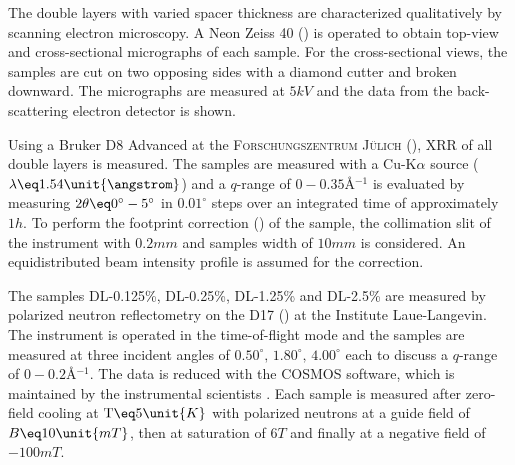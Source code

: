 \documentclass[\main/dresen_thesis.tex]{subfiles}
\begin{document}
    The double layers with varied spacer thickness are characterized qualitatively by scanning electron microscopy.
    A Neon Zeiss 40 () is operated to obtain top-view and cross-sectional micrographs of each sample.
    For the cross-sectional views, the samples are cut on two opposing sides with a diamond cutter and broken downward.
    The micrographs are measured at $5 \unit{kV}$ and the data from the back-scattering electron detector is shown.

    Using a Bruker D8 Advanced at the \textsc{Forschungszentrum J\"ulich} (), XRR of all double layers is measured.
    The samples are measured with a Cu-K$\alpha$ source ($\lambda \eq 1.54 \unit{\angstrom}$) and a $q$-range of $0 - 0.35 \unit{\angstrom^{-1}}$ is evaluated by measuring $2 \theta \eq 0^\circ - 5 ^\circ$ in $0.01 ^\circ$ steps over an integrated time of approximately $1 \unit{h}$.
    To perform the footprint correction () of the sample, the collimation slit of the instrument with $0.2 \unit{mm}$ and samples width of $10 \unit{mm}$ is considered.
    An equidistributed beam intensity profile is assumed for the correction.

    The samples DL-0.125\%, DL-0.25\%, DL-1.25\% and DL-2.5\% are measured by polarized neutron reflectometry on the D17 () at the Institute Laue-Langevin.
    The instrument is operated in the time-of-flight mode and the samples are measured at three incident angles of $0.50^\circ ,\, 1.80^\circ ,\, 4.00^\circ$ each to discuss a $q$-range of $0 - 0.2 \unit{\angstrom^{-1}}$.
    The data is reduced with the COSMOS software, which is maintained by the instrumental scientists \cite{Gutfreund_2018_Towar}.
    Each sample is measured after zero-field cooling at $\mathrm{T} \eq 5 \unit{K}$ with polarized neutrons at a guide field of $B \eq 10 \unit{mT}$, then at saturation of $6 \unit{T}$ and finally at a negative field of $-100 \unit{mT}$.
\end{document}
